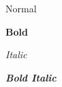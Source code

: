 \documentclass{article}
\begin{document}
Normal

\textbf{Bold}

\textit{Italic}

\textbf{\textit{Bold Italic}}
\end{document}
